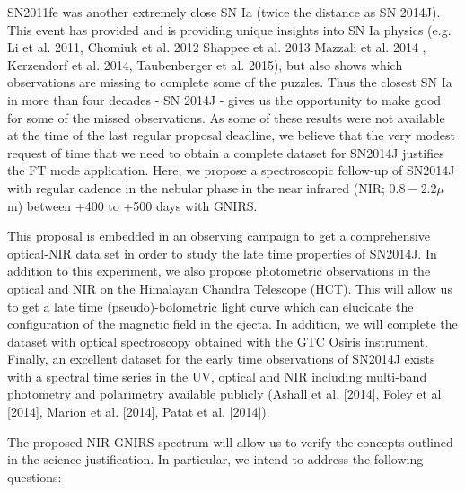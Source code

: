 \documentclass[11pt]{article}
\begin{document}

%

\expdesign    %
SN2011fe was another extremely close SN Ia (twice the distance as SN 2014J). This event  has provided and is providing unique insights into SN Ia physics (e.g. Li et al. 2011, Chomiuk et al. 2012 Shappee et al. 2013 Mazzali et al. 2014 , Kerzendorf et al. 2014, Taubenberger et al. 2015), but also shows which observations are missing to complete some of the puzzles. Thus the closest SN Ia in more than four decades - SN 2014J - gives us the opportunity to make good for some of the missed observations. As some of these results were not available at the time of the last regular proposal deadline, we believe that the very modest request of time that we need to obtain a complete dataset for SN2014J justifies the FT mode application. Here, we propose a spectroscopic follow-up of SN2014J with regular cadence in the nebular phase in the near infrared (NIR; $0.8 - 2.2 \mu$m) between +400 to +500 days with GNIRS. 

This proposal is embedded in an observing campaign to get a comprehensive optical-NIR data set in order to study the late time properties of SN2014J. In addition to this experiment, we also propose photometric observations in the optical and NIR on the Himalayan Chandra Telescope (HCT). This will allow us to get a late time (pseudo)-bolometric light curve which can elucidate the configuration of the magnetic field in the ejecta. In addition, we will complete the dataset with optical spectroscopy obtained with the GTC Osiris instrument. Finally, an excellent dataset for the early time observations of SN2014J exists with a spectral time series in the UV, optical and NIR including multi-band photometry and polarimetry available publicly (Ashall et al. [2014], Foley et al. [2014], Marion et al. [2014], Patat et al. [2014]).
		 	 	 		
			
				
					
The proposed NIR GNIRS spectrum will allow us to verify the concepts outlined in the science justification. In particular, we intend to address the following questions: 
\end{document}
